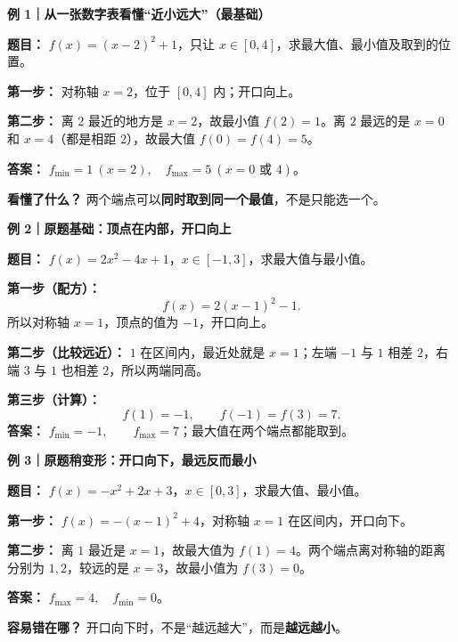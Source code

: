 \clearpage
\begin{examplebox}
\textbf{\textcolor{CExample}{例 1｜从一张数字表看懂“近小远大”（最基础）}}



\textbf{题目：} $f(x)=(x-2)^2+1$，只让 $x\in[0,4]$，求最大值、最小值及取到的位置。

\textbf{第一步：} 对称轴 $x=2$，位于 $[0,4]$ 内；开口向上。

\textbf{第二步：} 离 $2$ 最近的地方是 $x=2$，故最小值 $f(2)=1$。离 $2$ 最远的是 $x=0$ 和 $x=4$（都是相距 $2$），故最大值 $f(0)=f(4)=5$。

\textbf{答案：} $\boxed{f_{\min}=1\ (x=2),\quad f_{\max}=5\ (x=0\text{ 或 }4)}$。

\textbf{看懂了什么？} 两个端点可以\textbf{同时取到同一个最值}，不是只能选一个。

\medskip

\end{examplebox}
\clearpage
\begin{examplebox}
\textbf{\textcolor{CExample}{例 2｜原题基础：顶点在内部，开口向上}}



\textbf{题目：} $f(x)=2x^2-4x+1$，$x\in[-1,3]$，求最大值与最小值。

\textbf{第一步（配方）：}
\[
 f(x)=2(x-1)^2-1.
\]
所以对称轴 $x=1$，顶点的值为 $-1$，开口向上。

\textbf{第二步（比较远近）：} $1$ 在区间内，最近处就是 $x=1$；左端 $-1$ 与 $1$ 相差 $2$，右端 $3$ 与 $1$ 也相差 $2$，所以两端同高。

\textbf{第三步（计算）：}
\[
 f(1)=-1,\qquad f(-1)=f(3)=7.
\]
\textbf{答案：} $\boxed{f_{\min}=-1,\qquad f_{\max}=7}$；最大值在两个端点都能取到。

\medskip

\end{examplebox}
\clearpage
\begin{examplebox}
\textbf{\textcolor{CExample}{例 3｜原题稍变形：开口向下，最远反而最小}}



\textbf{题目：} $f(x)=-x^2+2x+3$，$x\in[0,3]$，求最大值、最小值。

\textbf{第一步：} $f(x)=-(x-1)^2+4$，对称轴 $x=1$ 在区间内，开口向下。

\textbf{第二步：} 离 $1$ 最近是 $x=1$，故最大值为 $f(1)=4$。两个端点离对称轴的距离分别为 $1,2$，较远的是 $x=3$，故最小值为 $f(3)=0$。

\textbf{答案：} $\boxed{f_{\max}=4,\quad f_{\min}=0}$。

\textbf{容易错在哪？} 开口向下时，不是“越远越大”，而是\textbf{越远越小}。

\medskip

\end{examplebox}
